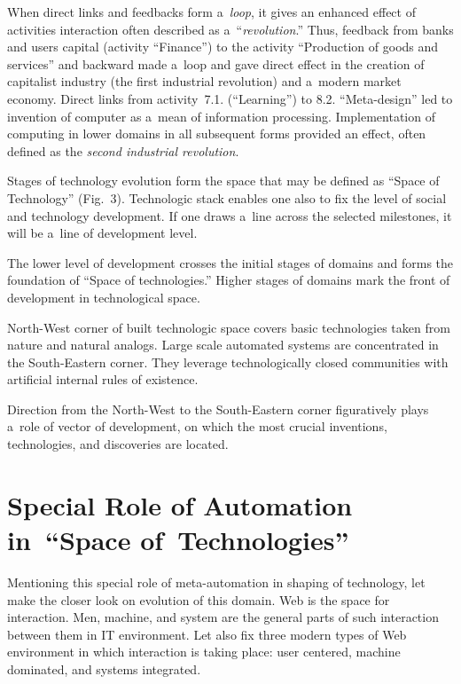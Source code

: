 \begin{multicols}{2}
 When direct links and feedbacks form a~\textit{loop}, it gives an enhanced effect of activities interaction
often described as a~``\textit{revolution}.'' Thus, feedback from banks and users capital (activity
``Finance'') to the activity ``Production of goods and services'' and backward made a~loop and gave direct
effect in the creation of capitalist industry (the first industrial revolution) and a~modern market economy.
Direct links from activity~7.1. (``Learning'') to 8.2. ``Meta-design'' led to invention of computer as a~mean
of information processing. Implementation of computing in lower domains in all subsequent forms
provided an effect, often defined as the \textit{second industrial revolution}.

 Stages of technology evolution form the space that may be
 defined as ``Space of Technology'' (Fig.~3).
Technologic stack enables one also to fix the level of social and technology development. If one draws a~line
across the selected milestones, it will be a~line of development level.

 The lower level of development crosses the initial stages of domains and forms the foundation of ``Space
of technologies.'' Higher stages of domains mark the front of development in technological space.

 North-West corner of built technologic space covers basic technologies taken from nature and natural
analogs. Large scale automated systems are concentrated in the South-Eastern corner.  They leverage
technologically closed communities with artificial internal rules of existence.

 Direction from the North-West to the South-Eastern corner figuratively plays a~role of vector of
development, on which the most crucial inventions, technologies, and discoveries are located.

\section{Special Role of Automation in~``Space of~Technologies''}

\noindent
 	Mentioning this special role of meta-automation in shaping of technology,
 let make the closer look on
evolution of this domain. Web is the space for interaction. Men, machine, and system are the general parts
of such interaction between them in IT environment. Let
also fix three modern types of Web environment
in which interaction is taking place: user centered, machine dominated,
and systems integrated.


\end{multicols}
